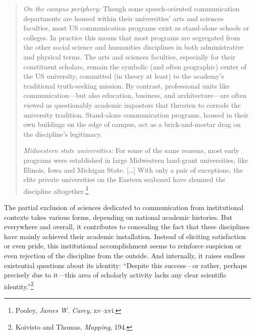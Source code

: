\documentclass{tufte-handout}
\begin{document}
\begin{quote}
\emph{On the campus periphery:} Though some speech-oriented
communication departments are housed within their universities' arts and
sciences faculties, most US communication programs exist as stand-alone
schools or colleges. In practice this means that most programs are
segregated from the other social science and humanities disciplines in
both administrative and physical terms. The arts and sciences faculties,
especially for their constituent scholars, remain the symbolic (and
often geographic) center of the US university, committed (in theory at
least) to the academy's traditional truth-seeking mission. By contrast,
professional units like communication---but also education, business,
and architecture---are often\setcounter{footnote}{61} viewed as questionably academic impostors
that threaten to corrode the university tradition. Stand-alone
communication programs, housed in their own buildings on the edge of
campus, act as a brick-and-mortar drag on the discipline's legitimacy.

\emph{Midwestern state universities:} For some of the same reasons, most
early programs were established in large Midwestern land-grant
universities, like Illinois, Iowa and Michigan State. {[}\ldots{]} With
only a pair of exceptions, the elite private universities on the Eastern
seaboard have shunned the discipline altogether.\footnote{Pooley,
  \emph{James W. Carey}, xv--xvi.}
\end{quote}

The partial exclusion of sciences dedicated to communication from
institutional contexts takes various forms, depending on national
academic histories. But everywhere and overall, it contributes to
concealing the fact that these disciplines have mainly achieved their
academic installation. Instead of eliciting satisfaction or even pride,
this institutional accomplishment seems to reinforce suspicion or even
rejection of the discipline from the outside. And internally, it raises
endless existential questions about its identity: ``Despite this
success---or rather, perhaps precisely due to it---this area of
scholarly activity lacks any clear scientific identity.''\footnote{Koivisto
  and Thomas, \emph{Mapping}, 194.}
\end{document}
